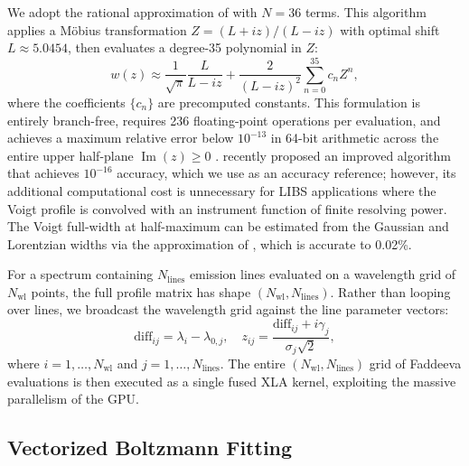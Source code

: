 We adopt the rational approximation of \citet{Weideman1994} with $N = 36$ terms.
This algorithm applies a M\"obius transformation $Z = (L + iz)/(L - iz)$ with optimal shift $L \approx 5.0454$, then evaluates a degree-35 polynomial in $Z$:
\begin{equation}
  w(z) \approx \frac{1}{\sqrt{\pi}} \frac{L}{L - iz}
    + \frac{2}{(L - iz)^2} \sum_{n=0}^{35} c_n Z^n,
  \label{eq:weideman}
\end{equation}
where the coefficients $\{c_n\}$ are precomputed constants.
This formulation is entirely branch-free, requires 236 floating-point operations per evaluation, and achieves a maximum relative error below $10^{-13}$ in 64-bit arithmetic across the entire upper half-plane $\operatorname{Im}(z) \geq 0$ \citep{Weideman1994}.
\citet{Zaghloul2024} recently proposed an improved algorithm that achieves $10^{-16}$ accuracy, which we use as an accuracy reference; however, its additional computational cost is unnecessary for LIBS applications where the Voigt profile is convolved with an instrument function of finite resolving power.
The Voigt full-width at half-maximum can be estimated from the Gaussian and Lorentzian widths via the approximation of \citet{Olivero1977}, which is accurate to 0.02\%.

For a spectrum containing $N_\mathrm{lines}$ emission lines evaluated on a wavelength grid of $N_\mathrm{wl}$ points, the full profile matrix has shape $(N_\mathrm{wl}, N_\mathrm{lines})$.
Rather than looping over lines, we broadcast the wavelength grid against the line parameter vectors:
\begin{equation}
  \mathrm{diff}_{ij} = \lambda_i - \lambda_{0,j}, \quad
  z_{ij} = \frac{\mathrm{diff}_{ij} + i\gamma_j}{\sigma_j \sqrt{2}},
  \label{eq:voigt-broadcast}
\end{equation}
where $i = 1, \ldots, N_\mathrm{wl}$ and $j = 1, \ldots, N_\mathrm{lines}$.
The entire $(N_\mathrm{wl}, N_\mathrm{lines})$ grid of Faddeeva evaluations is then executed as a single fused XLA kernel, exploiting the massive parallelism of the GPU.

\subsection{Vectorized Boltzmann Fitting}
\label{sec:boltzmann}

